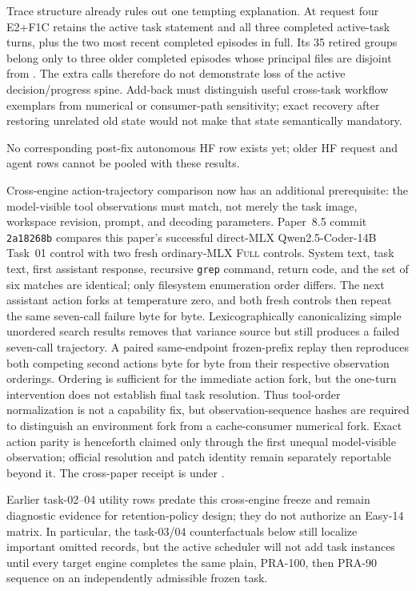 \documentclass[11pt]{article}
\begin{document}
Trace structure already rules out one tempting explanation.  At request four
E2+F1C retains the active task statement and all three completed active-task
turns, plus the two most recent completed episodes in full.  Its 35 retired
groups belong only to three older completed episodes whose principal files are
disjoint from .  The extra calls
therefore do not demonstrate loss of the active decision/progress spine.
Add-back must distinguish useful cross-task workflow exemplars from numerical
or consumer-path sensitivity; exact recovery after restoring unrelated old
state would not make that state semantically mandatory.

No corresponding post-fix autonomous HF row exists yet; older HF request and
agent rows cannot be pooled with these results.

Cross-engine action-trajectory comparison now has an additional prerequisite:
the model-visible tool observations must match, not merely the task image,
workspace revision, prompt, and decoding parameters.  Paper~8.5 commit
\texttt{2a18268b} compares this paper's successful direct-MLX
Qwen2.5-Coder-14B Task~01 control with two fresh ordinary-MLX \textsc{Full}
controls.  System text, task text, first assistant response, recursive
\texttt{grep} command, return code, and the set of six matches are identical;
only filesystem enumeration order differs.  The next assistant action forks
at temperature zero, and both fresh controls then repeat the same seven-call
failure byte for byte.  Lexicographically canonicalizing simple unordered
search results removes that variance source but still produces a failed
seven-call trajectory.  A paired same-endpoint frozen-prefix replay then
reproduces both competing second actions byte for byte from their respective
observation orderings.  Ordering is sufficient for the immediate action fork,
but the one-turn intervention does not establish final task resolution.  Thus
tool-order normalization is not a capability fix,
but observation-sequence hashes are required to distinguish an environment
fork from a cache-consumer numerical fork.  Exact action parity is henceforth
claimed only through the first unequal model-visible observation; official
resolution and patch identity remain separately reportable beyond it.  The
cross-paper receipt is under
.

Earlier task-02--04 utility rows predate this cross-engine freeze and remain
diagnostic evidence for retention-policy design; they do not authorize an
Easy-14 matrix.  In particular, the task-03/04 counterfactuals below still
localize important omitted records, but the active scheduler will not add task
instances until every target engine completes the same plain, PRA-100, then
PRA-90 sequence on an independently admissible frozen task.
\end{document}
